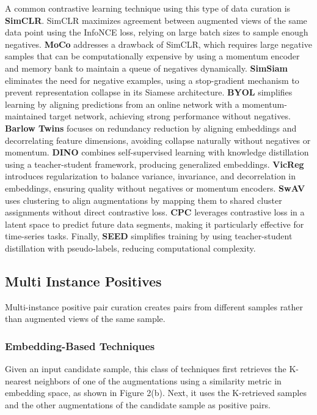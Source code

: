 A common contrastive learning technique using this type of data curation is \textbf{SimCLR}\cite{chen2020simple}. SimCLR maximizes agreement between augmented views of the same data point using the InfoNCE loss, relying on large batch sizes to sample enough negatives. \textbf{MoCo} \cite{he2020momentum} addresses a drawback of SimCLR, which requires large negative samples that can be computationally expensive by using a momentum encoder and memory bank to maintain a queue of negatives dynamically. \textbf{SimSiam} \cite{chen2021exploring} eliminates the need for negative examples, using a stop-gradient mechanism to prevent representation collapse in its Siamese architecture. \textbf{BYOL} \cite{grill2020bootstrap} simplifies learning by aligning predictions from an online network with a momentum-maintained target network, achieving strong performance without negatives. \textbf{Barlow Twins} \cite{zbontar2021barlow} focuses on redundancy reduction by aligning embeddings and decorrelating feature dimensions, avoiding collapse naturally without negatives or momentum. \textbf{DINO} \cite{caron2021emerging} combines self-supervised learning with knowledge distillation using a teacher-student framework, producing generalized embeddings. \textbf{VicReg} \cite{bardes2021vicreg} introduces regularization to balance variance, invariance, and decorrelation in embeddings, ensuring quality without negatives or momentum encoders. \textbf{SwAV} \cite{caron2020unsupervised} uses clustering to align augmentations by mapping them to shared cluster assignments without direct contrastive loss. \textbf{CPC} \cite{oord2018representation} leverages contrastive loss in a latent space to predict future data segments, making it particularly effective for time-series tasks. Finally, \textbf{SEED} \cite{fang2021seed} simplifies training by using teacher-student distillation with pseudo-labels, reducing computational complexity. %





\subsection{Multi Instance Positives}
Multi-instance positive pair curation creates pairs from different samples rather than augmented views of the same sample.

\subsubsection{Embedding-Based Techniques}
Given an input candidate sample, this class of techniques first retrieves the K-nearest neighbors of one of the augmentations using a similarity metric in embedding space, as shown in Figure 2(b). Next, it uses the K-retrieved samples and the other augmentations of the candidate sample as positive pairs. 

